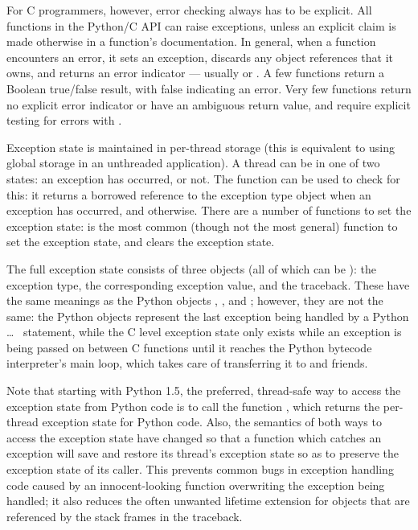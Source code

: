 For C programmers, however, error checking always has to be explicit.  
All functions in the Python/C API can raise exceptions, unless an 
explicit claim is made otherwise in a function's documentation.  In 
general, when a function encounters an error, it sets an exception, 
discards any object references that it owns, and returns an 
error indicator --- usually \NULL{} or .  A few functions 
return a Boolean true/false result, with false indicating an error.
Very few functions return no explicit error indicator or have an 
ambiguous return value, and require explicit testing for errors with 
.

Exception state is maintained in per-thread storage (this is 
equivalent to using global storage in an unthreaded application).  A 
thread can be in one of two states: an exception has occurred, or not.
The function  can be used to check for
this: it returns a borrowed reference to the exception type object
when an exception has occurred, and \NULL{} otherwise.  There are a
number of functions to set the exception state:
 is the most
common (though not the most general) function to set the exception
state, and  clears the
exception state.

The full exception state consists of three objects (all of which can 
be \NULL): the exception type, the corresponding exception 
value, and the traceback.  These have the same meanings as the Python
objects , , and
; however, they are not the same: the Python
objects represent the last exception being handled by a Python 
 \ldots\  statement, while the C level
exception state only exists while an exception is being passed on
between C functions until it reaches the Python bytecode interpreter's 
main loop, which takes care of transferring it to 
and friends.

Note that starting with Python 1.5, the preferred, thread-safe way to 
access the exception state from Python code is to call the function
, which returns the per-thread exception state 
for Python code.  Also, the semantics of both ways to access the 
exception state have changed so that a function which catches an 
exception will save and restore its thread's exception state so as to 
preserve the exception state of its caller.  This prevents common bugs 
in exception handling code caused by an innocent-looking function 
overwriting the exception being handled; it also reduces the often 
unwanted lifetime extension for objects that are referenced by the 
stack frames in the traceback.

